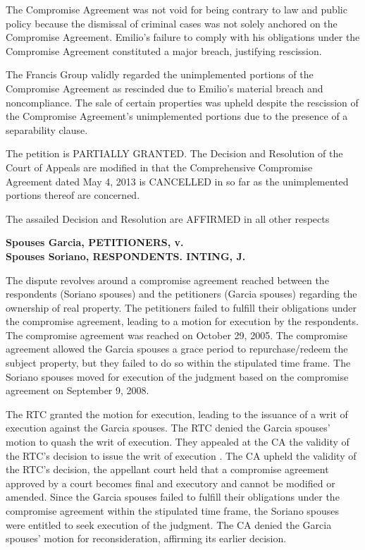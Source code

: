 \documentclass[
12pt,
oneside,
onehalfspacing,
headsepline
]{DigestCollection}
\begin{document}
The Compromise Agreement was not void for being contrary to law and public policy because the dismissal of criminal cases was not solely anchored on the Compromise Agreement. Emilio's failure to comply with his obligations under the Compromise Agreement constituted a major breach, justifying rescission.

The Francis Group validly regarded the unimplemented portions of the Compromise Agreement as rescinded due to Emilio's material breach and noncompliance. The sale of certain properties was upheld despite the rescission of the Compromise Agreement's unimplemented portions due to the presence of a separability clause.

The petition is PARTIALLY GRANTED. The Decision and Resolution of the Court of Appeals are modified in that the Comprehensive Compromise Agreement dated May 4, 2013 is CANCELLED in so far as the unimplemented portions thereof are concerned.

The assailed Decision and Resolution are AFFIRMED in all other respects

\label{f59fea20-0a0f-11ef-932c-63c852f65e48}


\noindent\textbf{Spouses Garcia, PETITIONERS, v. \\Spouses Soriano, RESPONDENTS. INTING, J.}\vspace{0.4cm}

The dispute revolves around a compromise agreement reached between the respondents (Soriano spouses) and the petitioners (Garcia spouses) regarding the ownership of real property. The petitioners failed to fulfill their obligations under the compromise agreement, leading to a motion for execution by the respondents. The compromise agreement was reached on October 29, 2005. The compromise agreement allowed the Garcia spouses a grace period to repurchase/redeem the subject property, but they failed to do so within the stipulated time frame. The Soriano spouses moved for execution of the judgment based on the compromise agreement on September 9, 2008. 

The RTC granted the motion for execution, leading to the issuance of a writ of execution against the Garcia spouses. The RTC denied the Garcia spouses' motion to quash the writ of execution. They appealed at the CA the validity of the RTC's decision to issue the writ of execution . The CA upheld the validity of the RTC's decision, the appellant court held that a compromise agreement approved by a court becomes final and executory and cannot be modified or amended. Since the Garcia spouses failed to fulfill their obligations under the compromise agreement within the stipulated time frame, the Soriano spouses were entitled to seek execution of the judgment. The CA denied the Garcia spouses' motion for reconsideration, affirming its earlier decision. 
\end{document}
